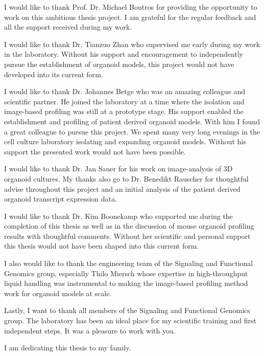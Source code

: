 \begin{flushleft}
I would like to thank Prof. Dr. Michael Boutros for providing the opportunity to work on this ambitious thesis project. I am grateful for the regular feedback and all the support received during my work.
\bigbreak

I would like to thank Dr. Tianzuo Zhan who supervised me early during my work in the laboratory. Without his support and encouragement to independently pursue the establishment of organoid models, this project would not have developed into its current form.  
\bigbreak

I would like to thank Dr. Johannes Betge who was an amazing colleague and scientific partner. He joined the laboratory at a time where the isolation and image-based profiling was still at a  prototype stage. His support enabled the establishment and profiling of patient derived organoid models. With him I found a great colleague to pursue this project. We spent many very long evenings in the cell culture laboratory isolating and expanding organoid models. Without his support the presented work would not have been possible. 
\bigbreak

I would like to thank Dr. Jan Sauer for his work on image-analysis of 3D organoid cultures. My thanks also go to Dr. Benedikt Rauscher for thoughtful advise throughout this project and an initial analysis of the patient derived organoid transcript expression data.  
\bigbreak

I would like to thank Dr. Kim Boonekamp who supported me during the completion of this thesis as well as in the discussion of mouse organoid profiling results with thoughtful comments. Without her scientific and personal support this thesis would not have been shaped into this current form.
\bigbreak

I also would like to thank the engineering team of the Signaling and Functional Genomics group, especially Thilo Miersch whose expertise in high-throughput liquid handling was instrumental to making the image-based profiling method work for organoid models at scale. 
\bigbreak

Lastly, I want to thank all members of the Signaling and Functional Genomics group. The laboratory has been an ideal place for my scientific training and first independent steps. It was a pleasure to work with you. 
\bigbreak

I am dedicating this thesis to my family.
\end{flushleft}